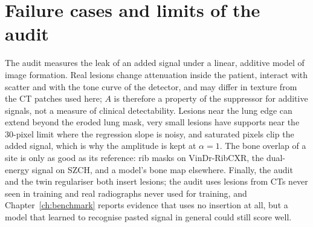 \section{Failure cases and limits of the audit}
The audit measures the leak of an added signal under a linear, additive model of image formation. Real lesions change attenuation inside the
patient, interact with scatter and with the tone curve of the detector, and may differ in texture from the CT patches used here; $A$ is
therefore a property of the suppressor for additive signals, not a measure of clinical detectability. Lesions near the lung edge can extend
beyond the eroded lung mask, very small lesions have supports near the 30-pixel limit where the regression slope is noisy, and saturated pixels
clip the added signal, which is why the amplitude is kept at $\alpha=1$. The bone overlap of a site is only as good as its reference: rib masks
on VinDr-RibCXR, the dual-energy signal on SZCH, and a model's bone map elsewhere. Finally, the audit and the twin regulariser both insert
lesions; the audit uses lesions from CTs never seen in training and real radiographs never used for training, and Chapter~\ref{ch:benchmark}
reports evidence that uses no insertion at all, but a model that learned to recognise pasted signal in general could still score well.
